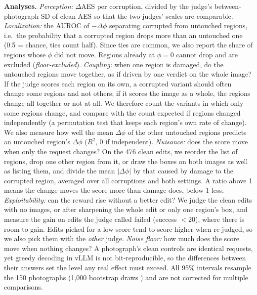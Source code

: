 \documentclass[10pt,a4paper]{article}
\begin{document}
\textbf{Analyses.} \emph{Perception:} $\Delta$AES per corruption, divided by the judge's between-photograph SD of clean AES so that the two judges' scales are comparable. \emph{Localization:} the AUROC of $-\Delta\phi$ separating corrupted from untouched regions, i.e.\ the probability that a corrupted region drops more than an untouched one (0.5 = chance, ties count half). Since ties are common, we also report the share of regions whose $\phi$ did not move. Regions already at $\phi=0$ cannot drop and are excluded (\emph{floor-excluded}). \emph{Coupling:} when one region is damaged, do the untouched regions move together, as if driven by one verdict on the whole image? If the judge scores each region on its own, a corrupted variant should often change some regions and not others; if it scores the image as a whole, the regions change all together or not at all. We therefore count the variants in which only some regions change, and compare with the count expected if regions changed independently (a permutation test that keeps each region's own rate of change). We also measure how well the mean $\Delta\phi$ of the other untouched regions predicts an untouched region's $\Delta\phi$ ($R^2$, 0 if independent). \emph{Nuisance:} does the score move when only the request changes? On the 476 clean edits, we reorder the list of regions, drop one other region from it, or draw the boxes on both images as well as listing them, and divide the mean $|\Delta\phi|$ by that caused by damage to the corrupted region, averaged over all corruptions and both settings. A ratio above 1 means the change moves the score more than damage does, below 1 less. \emph{Exploitability:} can the reward rise without a better edit? We judge the clean edits with no images, or after sharpening the whole edit or only one region's box, and measure the gain on edits the judge called failed (success $<20$), where there is room to gain. Edits picked for a low score tend to score higher when re-judged, so we also pick them with the \emph{other} judge. \emph{Noise floor:} how much does the score move when nothing changes? A photograph's clean controls are identical requests, yet greedy decoding in vLLM \cite{kwon2023vllm} is not bit-reproducible, so the differences between their answers set the level any real effect must exceed. All 95\% intervals resample the 150 photographs (1,000 bootstrap draws \cite{efron1993bootstrap}) and are not corrected for multiple comparisons.

\end{document}
